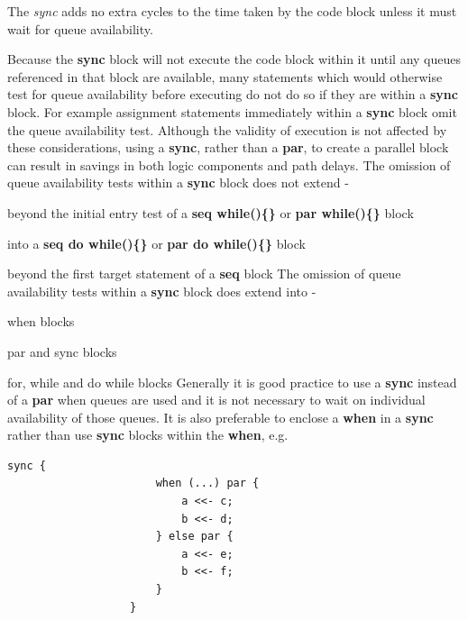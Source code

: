            The {\em sync} adds no extra cycles to the time taken
            by the code block unless it must wait for queue availability.
            
            Because the {\bf sync} block will not execute the code block
            within it until any queues referenced in that block are available,
            many statements which would otherwise test for queue availability
            before executing do not do so if they are within a {\bf sync}
            block. For example assignment statements immediately
            within a {\bf sync} block omit the queue availability test.
            Although the validity of execution is not affected by these
            considerations, using a {\bf sync}, rather than a {\bf par},
            to create a parallel block can result in savings in both
            logic components and path delays. The omission of
            queue availability tests within a {\bf sync} block does not extend -
            \blist
            \item   beyond the initial entry test of a {\bf seq while()\{\}}
                    or {\bf par while()\{\}} block
            \item   into a {\bf seq do while()\{\}} or {\bf par do while()\{\}}
                    block
            \item   beyond the first target statement of a {\bf seq} block
            \blend
            The omission of queue availability tests within a {\bf sync} block
            does extend into -
            \blist
            \item   when blocks
            \item   par and sync blocks
            \item   for, while and do while blocks
            \blend
            Generally it is good practice to use a {\bf sync} instead of
            a {\bf par} when queues are used and it is not necessary to
            wait on individual availability of those queues. It is also
            preferable to enclose a {\bf when} in a {\bf sync} rather than
            use {\bf sync} blocks within the {\bf when}, e.g.
            \begin{lstlisting}[gobble=12, language=threepl]
                   sync {
                       when (...) par {
                           a <<- c;
                           b <<- d;
                       } else par {
                           a <<- e;
                           b <<- f;
                       }
                   }
            \end{lstlisting}
